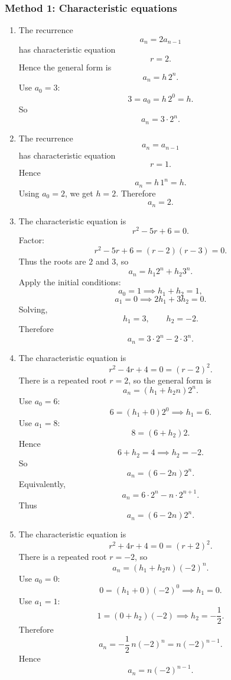 \documentclass[12pt]{article}
\begin{document}
\subsubsection*{Method 1: Characteristic equations}
\begin{enumerate}[label=(\alph*)]
\item The recurrence
\[
a_n=2a_{n-1}
\]
has characteristic equation
\[
r=2.
\]
Hence the general form is
\[
a_n=h\,2^n.
\]
Use \(a_0=3\):
\[
3=a_0=h\,2^0=h.
\]
So
\[
\boxed{a_n=3\cdot 2^n.}
\]

\item The recurrence
\[
a_n=a_{n-1}
\]
has characteristic equation
\[
r=1.
\]
Hence
\[
a_n=h\,1^n=h.
\]
Using \(a_0=2\), we get \(h=2\). Therefore
\[
\boxed{a_n=2.}
\]

\item The characteristic equation is
\[
r^2-5r+6=0.
\]
Factor:
\[
r^2-5r+6=(r-2)(r-3)=0.
\]
Thus the roots are \(2\) and \(3\), so
\[
a_n=h_1 2^n+h_2 3^n.
\]
Apply the initial conditions:
\[
a_0=1 \implies h_1+h_2=1,
\]
\[
a_1=0 \implies 2h_1+3h_2=0.
\]
Solving,
\[
h_1=3,\qquad h_2=-2.
\]
Therefore
\[
\boxed{a_n=3\cdot 2^n-2\cdot 3^n.}
\]

\item The characteristic equation is
\[
r^2-4r+4=0=(r-2)^2.
\]
There is a repeated root \(r=2\), so the general form is
\[
a_n=(h_1+h_2 n)2^n.
\]
Use \(a_0=6\):
\[
6=(h_1+0)2^0 \implies h_1=6.
\]
Use \(a_1=8\):
\[
8=(6+h_2)2.
\]
Hence
\[
6+h_2=4 \implies h_2=-2.
\]
So
\[
a_n=(6-2n)2^n.
\]
Equivalently,
\[
a_n=6\cdot 2^n-n\cdot 2^{n+1}.
\]
Thus
\[
\boxed{a_n=(6-2n)2^n.}
\]

\item The characteristic equation is
\[
r^2+4r+4=0=(r+2)^2.
\]
There is a repeated root \(r=-2\), so
\[
a_n=(h_1+h_2 n)(-2)^n.
\]
Use \(a_0=0\):
\[
0=(h_1+0)(-2)^0 \implies h_1=0.
\]
Use \(a_1=1\):
\[
1=(0+h_2)(-2) \implies h_2=-\frac12.
\]
Therefore
\[
a_n=-\frac12\,n(-2)^n=n(-2)^{n-1}.
\]
Hence
\[
\boxed{a_n=n(-2)^{n-1}.}
\]
\end{enumerate}

\newpage
\end{document}
